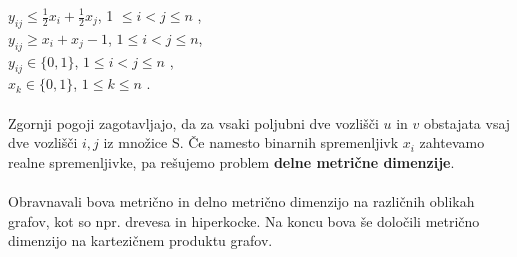 \documentclass[a4paper]{report}
\begin{document}
$ y_{ij} \le \frac{1}{2} x_i + \frac{1}{2} x_j$, 1 $\le i < j \le n$ , \\


$ y_{ij}\ge x_i + x_j - 1 $, $1 \le i < j \le n$,\\


$y_{ij}\in \{ 0,1 \} $, $1 \le i < j \le n$ ,\\


$x_k \in \{ 0, 1\}$, $1 \le k \le n$ .\\\\Zgornji pogoji zagotavljajo, da za vsaki poljubni dve vozlišči $u$ in $v$ obstajata vsaj dve vozlišči $i,j$  iz množice S. Če namesto binarnih spremenljivk $x_i$ zahtevamo realne spremenljivke, pa rešujemo problem \textbf{delne metrične dimenzije}. \\\\
Obravnavali bova metrično in delno metrično dimenzijo na različnih oblikah grafov, kot so npr. drevesa in hiperkocke. Na koncu bova še določili metrično dimenzijo na kartezičnem produktu grafov. \\
\end{document}
